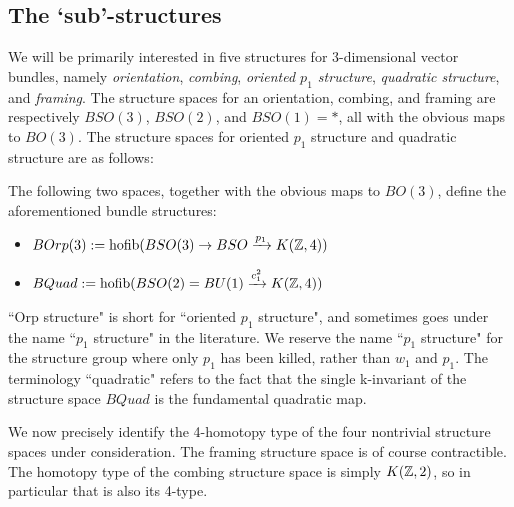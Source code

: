\documentclass{amsart}
\begin{document}

\subsection{The `sub'-structures}


We will be primarily interested in five structures for 3-dimensional vector bundles, namely \emph{orientation}, \emph{combing}, \emph{oriented $p_1$ structure}, \emph{quadratic structure}, and \emph{framing}.  The structure spaces for an orientation, combing, and framing are respectively $BSO(3)$, $BSO(2)$, and $BSO(1) = *$, all with the obvious maps to $BO(3)$.  The structure spaces for oriented $p_1$ structure and quadratic structure are as follows:

\begin{definition}
The following two spaces, together with the obvious maps to $BO(3)$, define the aforementioned bundle structures:
\begin{itemize}
\item[Orp:] $BOrp(3) := \operatorname{hofib}(BSO(3) \rightarrow BSO \xrightarrow{p_1} K(\mathbb Z,4))$
\item[Quad:] $BQuad := \operatorname{hofib}(BSO(2) = BU(1) \xrightarrow{c_1^2} K(\mathbb Z,4))$
\end{itemize}
\end{definition}

\begin{remark}
``Orp structure" is short for ``oriented $p_1$ structure", and sometimes goes under the name ``$p_1$ structure" in the literature.  We reserve the name ``$p_1$ structure" for the structure group where only $p_1$ has been killed, rather than $w_1$ and $p_1$.  The terminology ``quadratic" refers to the fact that the single k-invariant of the structure space $BQuad$ is the fundamental quadratic map.
\end{remark}


We now precisely identify the 4-homotopy type of the four nontrivial structure spaces under consideration.  The framing structure space is of course contractible.  The homotopy type of the combing structure space is simply $K(\mathbb Z,2)$, so in particular that is also its 4-type.
\end{document}
